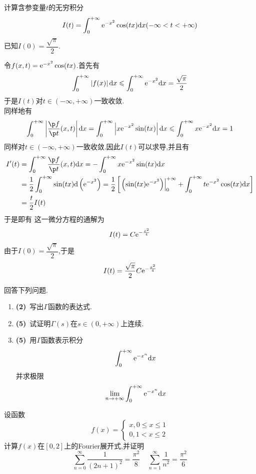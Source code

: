 \documentclass{ctexart}
\begin{document}
\begin{problem}[6.(10\songti{分})]
    计算含参变量$t$的无穷积分
    \[I(t)=\int_0^{+\infty}\mathrm{e}^{-x^2}\cos(tx)\mathrm{d} x(-\infty<t<+\infty)\]
    已知$I(0)=\dfrac{\sqrt{\pi}}{2}$.
\end{problem}
\begin{solution}
    令$f(x,t)=\mathrm{e}^{-x^2}\cos(tx)$.首先有
    \[\int_0^{+\infty}\left|f(x)\right|\mathrm{d} x\leqslant\int_0^{+\infty}\mathrm{e}^{-x^2}\mathrm{d} x=\dfrac{\sqrt{\pi}}{2}\]
    于是$I(t)$对$t\in(-\infty,+\infty)$一致收敛.\\
    同样地有
    \[\int_0^{+\infty}\left|\dfrac{\p f}{\p t}(x,t)\right|\di x
    =\int_0^{+\infty}\left|x\e^{-x^2}\sin(tx)\right|\di x
    \leqslant\int_0^{+\infty}x\e^{-x^2}\di x=1\]
    同样对$t\in(-\infty,+\infty)$一致收敛.因此$I(t)$可以求导,并且有
    \[\begin{aligned}
        I'(t)
        &= \int_0^{+\infty}\dfrac{\p f}{\p t}(x,t)\di x=-\int_0^{+\infty}x\e^{-x^2}\sin(tx)\di x \\
        &= \dfrac12\int_0^{+\infty}\sin(tx)\di\left(\e^{-x^2}\right)=\dfrac12\left[\left.\left(\sin(tx)\e^{-x^2}\right)\right|_0^{+\infty}+\int_0^{+\infty}t\e^{-x^2}\cos(tx)\di x\right] \\
        &= \dfrac{t}{2}I(t)
    \end{aligned}\]
    于是即有
    这一微分方程的通解为
    \[I(t)=C\mathrm{e}^{-\frac{x^2}{4}}\]
    由于$I(0)=\dfrac{\sqrt{\pi}}{2}$,于是
    \[I(t)=\dfrac{\sqrt{\pi}}{2}C\mathrm{e}^{-\frac{x^2}{4}}\]

\end{solution}
\begin{problem}[7.(12\songti{分})]
    回答下列问题.
    \begin{enumerate}[label=\tbf{(\arabic*)},topsep=0pt,parsep=0pt,itemsep=0pt,partopsep=0pt]
        \item \textbf{(2)}\ 写出$\Gamma$函数的表达式.
        \item \textbf{(5)}\ 试证明$\Gamma(s)$在$s\in(0,+\infty)$上连续.
        \item \textbf{(5)}\ 用$\Gamma$函数表示积分
            \[\int_0^{+\infty}\mathrm{e}^{-x^n}\mathrm{d} x\]
            并求极限
            \[\lim_{n\to+\infty}\int_0^{+\infty}\mathrm{e}^{-x^n}\mathrm{d} x\]

    \end{enumerate}

\end{problem}
\begin{problem}[8.(13\songti{分})]
    设函数
    \[f(x)=\left\{\begin{array}{l}
        x,0\leqslant x\leqslant 1\\
        0,1<x\leqslant 2
    \end{array}\right.\]
    计算$f(x)$在$[0,2]$上的Fourier展开式,并证明
    \[\sum_{n=0}^{\infty}\dfrac{1}{(2n+1)^2}=\dfrac{\pi^2}{8}\ \ \ \ \ \sum_{n=1}^{\infty}\dfrac{1}{n^2}=\dfrac{\pi^2}{6}\]

\end{problem}
\end{document}
